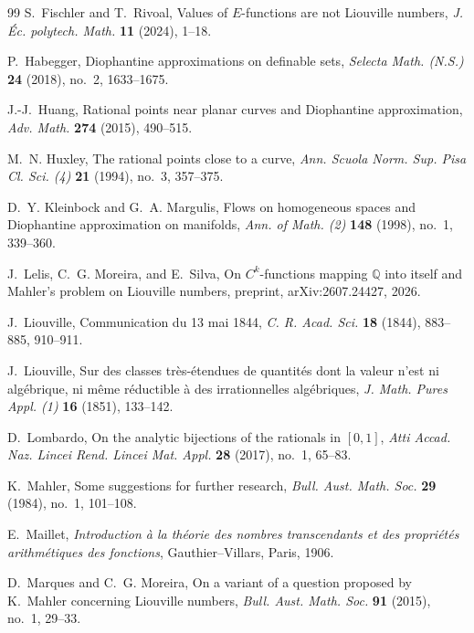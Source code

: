 \documentclass[11pt]{amsart}
\numberwithin{equation}{section}
\theoremstyle{definition}
\theoremstyle{remark}
\newcommand{\Q}{\mathbb Q}
\begin{document}
\begin{thebibliography}{99}
S.~Fischler and T.~Rivoal,
Values of $E$-functions are not Liouville numbers,
\emph{J. \'{E}c. polytech. Math.} \textbf{11} (2024), 1--18.

P.~Habegger,
Diophantine approximations on definable sets,
\emph{Selecta Math. (N.S.)} \textbf{24} (2018), no.~2, 1633--1675.

J.-J.~Huang,
Rational points near planar curves and Diophantine approximation,
\emph{Adv. Math.} \textbf{274} (2015), 490--515.

M.~N. Huxley,
The rational points close to a curve,
\emph{Ann. Scuola Norm. Sup. Pisa Cl. Sci. (4)} \textbf{21} (1994), no.~3, 357--375.

D.~Y. Kleinbock and G.~A. Margulis,
Flows on homogeneous spaces and Diophantine approximation on manifolds,
\emph{Ann. of Math. (2)} \textbf{148} (1998), no.~1, 339--360.


J.~Lelis, C.~G. Moreira, and E.~Silva,
On $C^k$-functions mapping $\Q$ into itself and Mahler's problem on Liouville numbers,
preprint, arXiv:2607.24427, 2026.

J.~Liouville,
Communication du 13 mai 1844,
\emph{C. R. Acad. Sci.} \textbf{18} (1844), 883--885, 910--911.

J.~Liouville,
Sur des classes tr\`es-\'etendues de quantit\'es dont la valeur
n'est ni alg\'ebrique, ni m\^eme r\'eductible \`a des
irrationnelles alg\'ebriques,
\emph{J. Math. Pures Appl. (1)} \textbf{16} (1851), 133--142.

D.~Lombardo,
On the analytic bijections of the rationals in $[0,1]$,
\emph{Atti Accad. Naz. Lincei Rend. Lincei Mat. Appl.} \textbf{28} (2017),
no.~1, 65--83.

K.~Mahler,
Some suggestions for further research,
\emph{Bull. Aust. Math. Soc.} \textbf{29} (1984), no.~1, 101--108.

E.~Maillet,
\emph{Introduction \`a la th\'eorie des nombres transcendants et des propri\'et\'es
arithm\'etiques des fonctions},
Gauthier--Villars, Paris, 1906.

D.~Marques and C.~G. Moreira,
On a variant of a question proposed by K.~Mahler concerning Liouville numbers,
\emph{Bull. Aust. Math. Soc.} \textbf{91} (2015), no.~1, 29--33.


\end{thebibliography}
\end{document}
